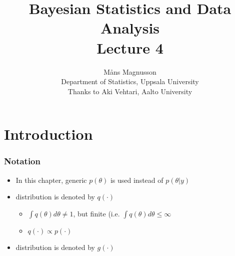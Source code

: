 \documentclass[10pt]{beamer}
\title[]{{\color{black}Bayesian Statistics and Data Analysis \\ Lecture 4}}
\author[]{M{\aa}ns Magnusson \\ Department of Statistics, Uppsala University \\ Thanks to Aki Vehtari, Aalto University}
\date{}
\begin{document}
\frame{\titlepage
}





\section{Introduction}

\begin{frame}

\frametitle{Notation}

  \begin{itemize}
  \item In this chapter, generic $p(\theta)$ is used instead of
    $p(\theta|y)$
    \pause
  \item {} distribution is denoted by $q(\cdot)$
    \begin{itemize}
    \item $\int q(\theta) d\theta \neq 1$, but finite (i.e. $\int q(\theta) d\theta \le \infty$
    \item $q(\cdot) \propto p(\cdot)$
    \end{itemize}
    \pause
  \item {} distribution is denoted by $g(\cdot)$
  \end{itemize}

\end{frame}
\end{document}
